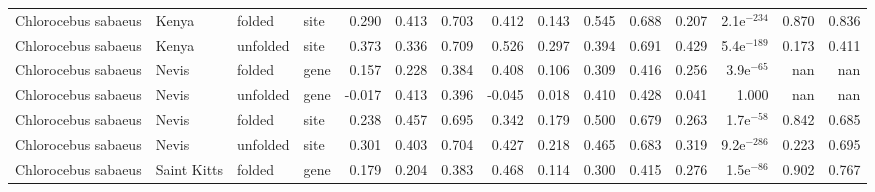 \begin{longtable}{llllrrrrrrrrrrr}
 Chlorocebus sabaeus &                     Kenya &    folded &  site &                              0.290 &                               0.413 &                 0.703 &                 0.412 &                              0.143 &                               0.545 &                 0.688 &                 0.207 & 2.1e$^{-234}$ &  0.870 &  0.836 \\
 Chlorocebus sabaeus &                     Kenya &  unfolded &  site &                              0.373 &                               0.336 &                 0.709 &                 0.526 &                              0.297 &                               0.394 &                 0.691 &                 0.429 & 5.4e$^{-189}$ &  0.173 &  0.411 \\
 Chlorocebus sabaeus &                     Nevis &    folded &  gene &                              0.157 &                               0.228 &                 0.384 &                 0.408 &                              0.106 &                               0.309 &                 0.416 &                 0.256 &  3.9e$^{-65}$ &    nan &    nan \\
 Chlorocebus sabaeus &                     Nevis &  unfolded &  gene &                             -0.017 &                               0.413 &                 0.396 &                -0.045 &                              0.018 &                               0.410 &                 0.428 &                 0.041 &         1.000 &    nan &    nan \\
 Chlorocebus sabaeus &                     Nevis &    folded &  site &                              0.238 &                               0.457 &                 0.695 &                 0.342 &                              0.179 &                               0.500 &                 0.679 &                 0.263 &  1.7e$^{-58}$ &  0.842 &  0.685 \\
 Chlorocebus sabaeus &                     Nevis &  unfolded &  site &                              0.301 &                               0.403 &                 0.704 &                 0.427 &                              0.218 &                               0.465 &                 0.683 &                 0.319 & 9.2e$^{-286}$ &  0.223 &  0.695 \\
 Chlorocebus sabaeus &               Saint Kitts &    folded &  gene &                              0.179 &                               0.204 &                 0.383 &                 0.468 &                              0.114 &                               0.300 &                 0.415 &                 0.276 &  1.5e$^{-86}$ &  0.902 &  0.767 \\

\end{longtable}
